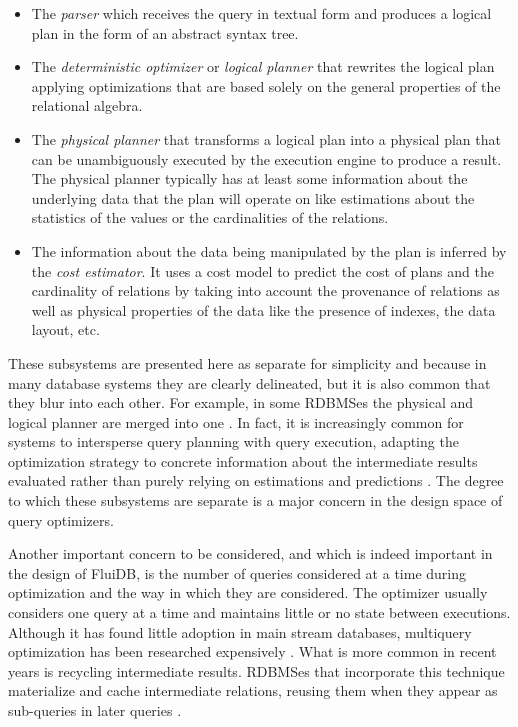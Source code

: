 \begin{itemize}

\item The \emph{parser} which receives the query in textual form and
  produces a logical plan in the form of an abstract syntax tree.
\item The \emph{deterministic optimizer} or \emph{logical planner}
  that rewrites the logical plan applying optimizations that are based
  solely on the general properties of the relational algebra.
\item The \emph{physical planner} that transforms a logical plan into
  a physical plan that can be unambiguously executed by the execution
  engine to produce a result. The physical planner typically has at
  least some information about the underlying data that the plan will
  operate on like estimations about the statistics of the values or
  the cardinalities of the relations.
\item The information about the data being manipulated by the plan is
  inferred by the \emph{cost estimator}. It uses a cost model to
  predict the cost of plans and the cardinality of relations by taking
  into account the provenance of relations as well as physical
  properties of the data like the presence of indexes, the data layout,
  etc.
\end{itemize}

These subsystems are presented here as separate for simplicity and
because in many database systems they are clearly delineated, but it is
also common that they blur into each other. For example, in some RDBMSes
the physical and logical planner are merged into one
\cite{graefeCascadesFrameworkQuery1995,shankarQueryOptimizationMicrosoft2012,solimanOrcaModularQuery2014}. In
fact, it is increasingly common for systems to intersperse query
planning with query execution, adapting the optimization strategy
\cite{graefeDynamicQueryEvaluation1989} to concrete information about
the intermediate results evaluated rather than purely relying on
estimations and predictions
\cite{dingPlanStitchHarnessing2018,chaudhuriPayasyougoFrameworkQuery2008,wuSamplingbasedQueryReoptimization2016,herodotouXplusSqltuningawareQuery2010}. The
degree to which these subsystems are separate is a major concern in
the design space of query optimizers.

Another important concern to be considered, and which is indeed
important in the design of FluiDB, is the number of queries considered
at a time during optimization and the way in which they are
considered. The optimizer usually considers one query at a time and
maintains little or no state between executions. Although it has found
little adoption in main stream databases, multiquery optimization has
been researched expensively
\cite{michiardiCachebasedMultiqueryOptimization2021,wangMultiqueryOptimizationMapreduce2013,royEfficientExtensibleAlgorithms2000,rogersMultiqueryOptimization2017}. What
is more common in recent years is recycling intermediate
results. RDBMSes that incorporate this technique materialize and cache
intermediate relations, reusing them when they appear as sub-queries in
later queries
\cite{perezHistoryawareQueryOptimization2014,nagelRecyclingPipelinedQuery2013,ivanovaArchitectureRecyclingIntermediates2010}.


